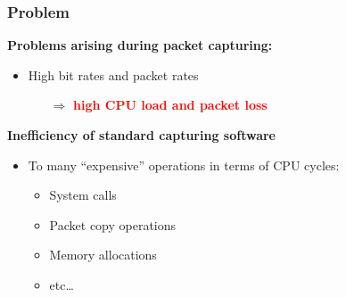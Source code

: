 \begin{frame}
\frametitle{Problem}
\textbf{Problems arising during packet capturing:}
\begin{itemize}
	\item High bit rates and packet rates
		\begin{itemize}
			\item [$\Rightarrow$] \textbf{\textcolor{red}{high CPU load and packet loss}}\newline
		\end{itemize}
\end{itemize}

\textbf{Inefficiency of standard capturing software}
\begin{itemize}
	\item To many ``expensive'' operations in terms of CPU cycles: 
\begin{itemize}
			\item System calls
			\item Packet copy operations
			\item Memory allocations
			\item etc\ldots\newline
\end{itemize}
\end{itemize}
\end{frame}

 {}
